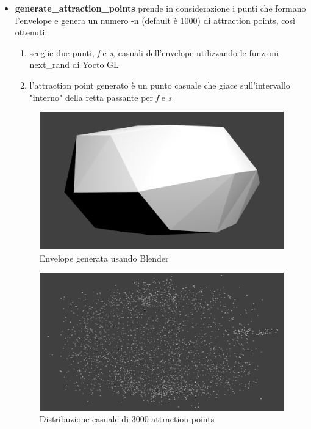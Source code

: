 \documentclass[10pt,a4paper]{report}
\begin{document}
\begin{itemize}
\item \textbf{generate\_attraction\_points} prende in considerazione i punti che formano l'envelope e genera un numero -n (default è 1000) di attraction points, così ottenuti:
\begin{enumerate}
\item sceglie due punti, \emph{f} e \emph{s}, casuali dell'envelope utilizzando le funzioni next\_rand di Yocto GL
\item l'attraction point generato è un punto casuale che giace sull'intervallo "interno" della retta passante per \emph{f} e \emph{s} 
\end{enumerate}
\begin{figure}[h]
\centering
\includegraphics[scale=0.37]{envelope.png}
\caption{Envelope generata usando Blender}
\end{figure}
\begin{figure}[h]
\centering
\includegraphics[scale=0.37]{points.png}
\caption{Distribuzione casuale di 3000 attraction points}
\end{figure}

\end{itemize}
\end{document}
